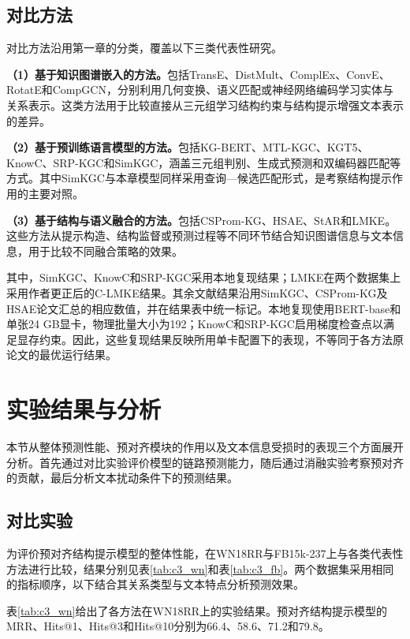 \subsection{对比方法}

对比方法沿用第一章的分类，覆盖以下三类代表性研究。

\textbf{（1）基于知识图谱嵌入的方法。}包括TransE、DistMult、ComplEx、ConvE、RotatE和CompGCN，分别利用几何变换、语义匹配或神经网络编码学习实体与关系表示。这类方法用于比较直接从三元组学习结构约束与结构提示增强文本表示的差异。

\textbf{（2）基于预训练语言模型的方法。}包括KG-BERT、MTL-KGC、KGT5、KnowC、SRP-KGC和SimKGC，涵盖三元组判别、生成式预测和双编码器匹配等方式。其中SimKGC与本章模型同样采用查询—候选匹配形式，是考察结构提示作用的主要对照。

\textbf{（3）基于结构与语义融合的方法。}包括CSProm-KG、HSAE、StAR和LMKE。这些方法从提示构造、结构监督或预测过程等不同环节结合知识图谱信息与文本信息，用于比较不同融合策略的效果。

其中，SimKGC、KnowC和SRP-KGC采用本地复现结果；LMKE在两个数据集上采用作者更正后的C-LMKE结果\cite{wang2022language}。其余文献结果沿用SimKGC、CSProm-KG及HSAE论文汇总的相应数值\cite{wang2022simkgc,chen2023cspromkg,xue2025hsae}，并在结果表中统一标记。本地复现使用BERT-base和单张24 GB显卡，物理批量大小为192；KnowC和SRP-KGC启用梯度检查点以满足显存约束。因此，这些复现结果反映所用单卡配置下的表现，不等同于各方法原论文的最优运行结果。

\section{实验结果与分析}

本节从整体预测性能、预对齐模块的作用以及文本信息受损时的表现三个方面展开分析。首先通过对比实验评价模型的链路预测能力，随后通过消融实验考察预对齐的贡献，最后分析文本扰动条件下的预测结果。

\subsection{对比实验}

为评价预对齐结构提示模型的整体性能，在WN18RR与FB15k-237上与各类代表性方法进行比较，结果分别见表\ref{tab:c3_wn}和表\ref{tab:c3_fb}。两个数据集采用相同的指标顺序，以下结合其关系类型与文本特点分析预测效果。

表\ref{tab:c3_wn}给出了各方法在WN18RR上的实验结果。预对齐结构提示模型的MRR、Hits@1、Hits@3和Hits@10分别为66.4、58.6、71.2和79.8。

